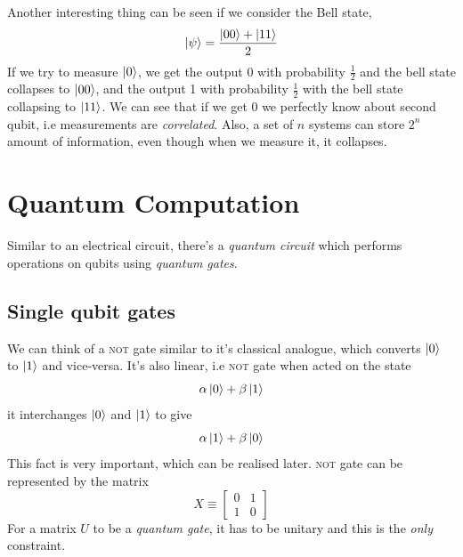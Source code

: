 Another interesting thing can be seen if we consider the Bell state,
\begin{equation}
    \ket{\psi} = \frac{\ket{00}+\ket{11}}{2}
\end{equation}
If we try to measure $\ket{0}$, we get the output 0 with probability $\frac{1}{2}$ and the bell state collapses to $\ket{00}$, and the output 1 with probability $\frac{1}{2}$ with the bell state collapsing to $\ket{11}$. We can see that if we get 0 we perfectly know about second qubit, i.e measurements are \textit{correlated}. Also, a set of $n$ systems can store $2^n$ amount of information, even though when we measure it, it collapses.

\section{Quantum Computation}
Similar to an electrical circuit, there's a \textit{quantum circuit} which performs operations on qubits using \textit{quantum gates}.
\subsection{Single qubit gates}
We can think of a \textsc{not} gate similar to it's classical analogue, which converts $\ket{0}$ to $\ket{1}$  and vice-versa. It's also linear, i.e \textsc{not} gate when acted on the state
\begin{equation}
    \alpha\ket{0} + \beta\ket{1}
\end{equation}
it interchanges $\ket{0}$ and $\ket{1}$ to give
\begin{equation}
    \alpha\ket{1} + \beta\ket{0}
\end{equation}
This fact is very important, which can be realised later. \textsc{not} gate can be represented by the matrix
\begin{equation}
    X \equiv \begin{bmatrix}
        0 & 1 \\ 1 & 0
    \end{bmatrix}
\end{equation}
For a matrix $U$ to be a \textit{quantum gate}, it has to be unitary and this is the \textit{only} constraint.

